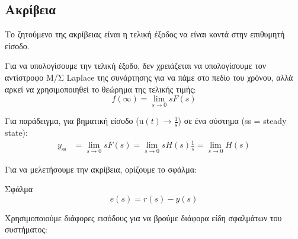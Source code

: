 \documentclass[11pt,a4paper,notitlepage,fleqn,draft]{article}
\begin{document}
\subsection{Ακρίβεια}
Το ζητούμενο της ακρίβειας είναι η τελική έξοδος να είναι κοντά στην επιθυμητή είσοδο.

Για να υπολογίσουμε την τελική έξοδο, δεν χρειάζεται να υπολογίσουμε τον αντίστροφο Μ/Σ
Laplace της συνάρτησης για να πάμε στο πεδίο του χρόνου, αλλά αρκεί να χρησιμοποιηθεί το θεώρημα της τελικής τιμής:
\[
f(\infty) = \lim_{s\to 0} sF(s)
 \]

Για παράδειγμα, για βηματική είσοδο (\( \mathrm u(t) \rightarrow \frac{1}{s}\))
σε ένα σύστημα (ss = steady state):
\begin{align*}
	y_{\mathrm{ss}} &= \lim_{s\to 0} sF(s) = \lim_{s\to 0} sH(s)\frac{1}{s} =
	\lim_{s\to 0} H(s)
\end{align*}

\begin{comment}
\begin{tikzpicture}
\def\h{0.6}
\def\l{1.2}
\def\ll{0.75}
\draw[->] (0,0) node[left] {$r(s)$} -- (1-0.2,0);
\begin{scope}[xshift=1cm]
\draw (0,0) circle (2mm);
\draw (0.2,0) -- ++(0.75,0);
\draw (0.2+0.75, -\h/2) rectangle ++(\l, \h) node[midway] {$G_1(s)$};
\draw (\l+0.2+0.75,0) -- (3,0);
\draw  (3, -\h/2) rectangle ++(\l, \h) node[midway] {$G_2(s)$};
\draw (3+\l,0) -- (5-0.2,0);
\draw[->] (5,1) -- ++(0,-1+0.2) node[midway,right] {$d(s)$};
\draw (5,0) circle (2mm);
\draw[->] (5+0.2,0) -- ++(1,0) node[right] {$y$};
\end{scope}

\draw[->] (4.5+2.2,0) -- ++(0,-1.5) -- (4,-1.5);
\draw (4,-1.5-\h/2) rectangle ++(-\l,\h) node[midway] {$H(s)$};
\draw[->] (4-\l,-1.5) -- (1,-1.5) -- (1,-0.2);
\end{tikzpicture}
\end{comment}

Για να μελετήσουμε την ακρίβεια, ορίζουμε το σφάλμα:
\begin{defn}{Σφάλμα}{}
	\[
	e(s) = r(s) - y(s)
	\]
\end{defn}

Χρησιμοποιούμε διάφορες εισόδους για να βρούμε διάφορα είδη σφαλμάτων του συστήματος:
\end{document}
